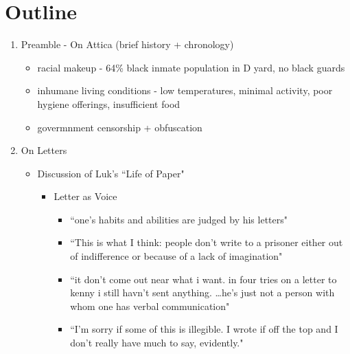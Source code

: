 \documentclass[14pt, letterpaper]{report}
\begin{document}
   \section*{Outline}
	
	\begin{enumerate}

		\item Preamble - On Attica (brief history + chronology)
		\begin{itemize}
			\item   racial makeup - 64\% black inmate population in D yard,\autocite[490]{attica-report}
				no black guards \autocite[147]{letters-from-attica}

			\item   inhumane living conditions - low temperatures, minimal activity, poor 
				hygiene offerings, insufficient food\autocite{blood-in-water}
			
			\item   govermnment censorship + obfuscation\autocite[573]{blood-in-water}
		\end{itemize}
	
		\item On Letters
		\begin{itemize}
		
			\item Discussion of Luk's ``Life of Paper"
			\begin{itemize}
				
				\item Letter as Voice
				\begin{itemize}
					
					\item ``one's habits and abilities are judged 
						by his letters"\autocite[2]{life-of-paper}

					\item ``This is what I think: people don't write to
						a prisoner either out of indifference or because
						of a lack of imagination"\autocite[6]{life-of-paper}

					\item ``it don't come out near what i want.
						in four tries on a letter to kenny i still havn't sent 
						anything. \ldots he's just not a person with whom one 
						has verbal communication"\autocite[87]{letters-from-attica}

					\item ``I'm sorry if some of this is illegible. I wrote if off the top 
						and I don't really have much to say, evidently."\autocite[144]{letters-from-attica}			
					

\end{itemize}
\end{itemize}
\end{itemize}
\end{enumerate}
\end{document}
